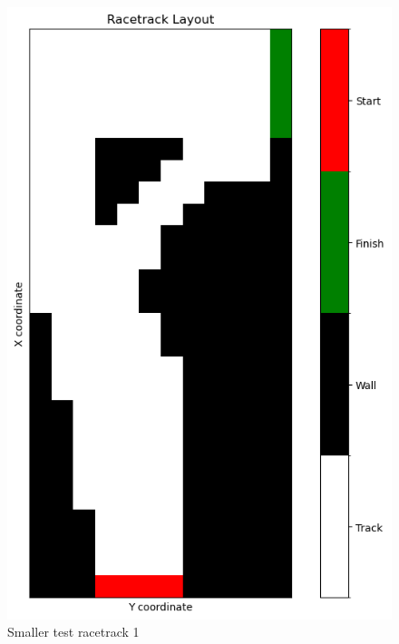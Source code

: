 \documentclass{article}
\begin{document}
\begin{figure}[h!]
\centering
\includegraphics[scale=0.2]{./images/test_racetrack1.png}
\caption{Smaller test racetrack 1}
\label{fig:test-racetrack1}
\end{figure}
\end{document}
